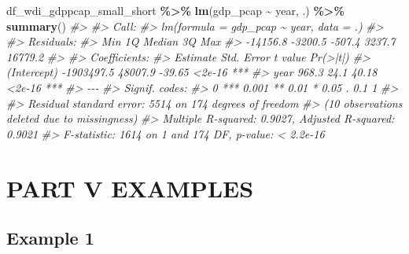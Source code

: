 \documentclass[
  xelatex, ja=standard]{bxjsbook}
\newenvironment{Shaded}{\begin{snugshade}}{\end{snugshade}}
\newcommand{\CommentTok}[1]{\textcolor[rgb]{0.56,0.35,0.01}{\textit{#1}}}
\newcommand{\FunctionTok}[1]{\textcolor[rgb]{0.13,0.29,0.53}{\textbf{#1}}}
\newcommand{\NormalTok}[1]{#1}
\newcommand{\SpecialCharTok}[1]{\textcolor[rgb]{0.81,0.36,0.00}{\textbf{#1}}}
\theoremstyle{definition}
\theoremstyle{definition}
\theoremstyle{definition}
\theoremstyle{definition}
\theoremstyle{remark}
\begin{document}
\begin{Shaded}
\begin{Highlighting}[]
\NormalTok{df\_wdi\_gdppcap\_small\_short }\SpecialCharTok{\%\textgreater{}\%} \FunctionTok{lm}\NormalTok{(gdp\_pcap }\SpecialCharTok{\textasciitilde{}}\NormalTok{ year, .) }\SpecialCharTok{\%\textgreater{}\%} \FunctionTok{summary}\NormalTok{()}
\CommentTok{\#\textgreater{} }
\CommentTok{\#\textgreater{} Call:}
\CommentTok{\#\textgreater{} lm(formula = gdp\_pcap \textasciitilde{} year, data = .)}
\CommentTok{\#\textgreater{} }
\CommentTok{\#\textgreater{} Residuals:}
\CommentTok{\#\textgreater{}      Min       1Q   Median       3Q      Max }
\CommentTok{\#\textgreater{} {-}14156.8  {-}3200.5   {-}507.4   3237.7  16779.2 }
\CommentTok{\#\textgreater{} }
\CommentTok{\#\textgreater{} Coefficients:}
\CommentTok{\#\textgreater{}               Estimate Std. Error t value Pr(\textgreater{}|t|)    }
\CommentTok{\#\textgreater{} (Intercept) {-}1903497.5    48007.9  {-}39.65   \textless{}2e{-}16 ***}
\CommentTok{\#\textgreater{} year             968.3       24.1   40.18   \textless{}2e{-}16 ***}
\CommentTok{\#\textgreater{} {-}{-}{-}}
\CommentTok{\#\textgreater{} Signif. codes:  }
\CommentTok{\#\textgreater{} 0 \textquotesingle{}***\textquotesingle{} 0.001 \textquotesingle{}**\textquotesingle{} 0.01 \textquotesingle{}*\textquotesingle{} 0.05 \textquotesingle{}.\textquotesingle{} 0.1 \textquotesingle{} \textquotesingle{} 1}
\CommentTok{\#\textgreater{} }
\CommentTok{\#\textgreater{} Residual standard error: 5514 on 174 degrees of freedom}
\CommentTok{\#\textgreater{}   (10 observations deleted due to missingness)}
\CommentTok{\#\textgreater{} Multiple R{-}squared:  0.9027, Adjusted R{-}squared:  0.9021 }
\CommentTok{\#\textgreater{} F{-}statistic:  1614 on 1 and 174 DF,  p{-}value: \textless{} 2.2e{-}16}
\end{Highlighting}
\end{Shaded}

\hypertarget{part-part-v-examples}{%
\part{PART V EXAMPLES}\label{part-part-v-examples}}

\hypertarget{example1}{%
\chapter{Example 1}\label{example1}}

\hypertarget{appendix-appendix}{%
\appendix}
\end{document}

